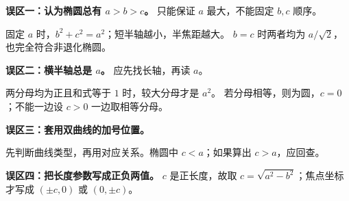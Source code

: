 \begin{trapbox}
\textbf{误区一：认为椭圆总有 $a>b>c$。} 只能保证 $a$ 最大，不能固定 $b,c$ 顺序。

固定 $a$ 时，$b^2+c^2=a^2$；短半轴越小，半焦距越大。
$b=c$ 时两者均为 $a/\sqrt2$，也完全符合非退化椭圆。
\end{trapbox}
\clearpage
\begin{trapbox}
\textbf{误区二：横半轴总是 $a$。} 应先找长轴，再读 $a$。

两分母均为正且和式等于 $1$ 时，较大分母才是 $a^2$。
若分母相等，则为圆，$c=0$；不能一边设 $c>0$ 一边取相等分母。
\end{trapbox}
\clearpage
\begin{trapbox}
\textbf{误区三：套用双曲线的加号位置。}

先判断曲线类型，再用对应关系。椭圆中 $c<a$；如果算出 $c>a$，应回查。

\textbf{误区四：把长度参数写成正负两值。}
$c$ 是正长度，故取 $c=\sqrt{a^2-b^2}$；焦点坐标才写成 $(\pm c,0)$ 或 $(0,\pm c)$。
\end{trapbox}
